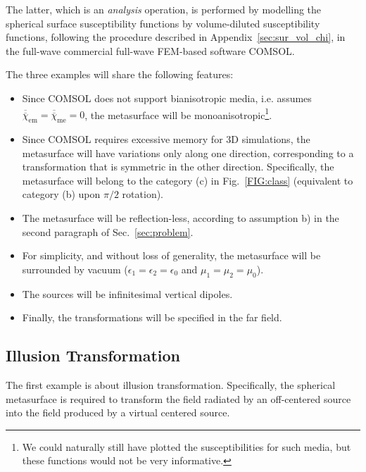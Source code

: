 \documentclass[journal,transaction]{IEEEtran}
\newcommand{\figref}{Fig.~\ref}
\newcommand{\te}[1]{\overline{\overline{#1}}}
\begin{document}
The latter, which is an \emph{analysis} operation, is performed by modelling the spherical surface susceptibility functions by volume-diluted susceptibility functions, following the procedure described in Appendix~\ref{sec:sur_vol_chi}, in the full-wave commercial full-wave FEM-based software COMSOL.

The three examples will share the following features:

\begin{itemize}
  \item Since COMSOL does not support bianisotropic media, i.e. assumes $\te{\chi}_\text{em}=\te{\chi}_\text{me}=0$, the metasurface will be monoanisotropic\footnote{We could naturally still have plotted the susceptibilities for such media, but these functions would not be very informative.}.
  \item Since COMSOL requires excessive memory for 3D simulations, the metasurface will have variations only along one direction, corresponding to a transformation that is symmetric in the other direction. Specifically, the metasurface will belong to the category (c) in \figref{FIG:class} (equivalent to category (b) upon $\pi/2$ rotation).
  \item The metasurface will be reflection-less, according to assumption b) in the second paragraph of Sec.~\ref{sec:problem}.
  \item For simplicity, and without loss of generality, the metasurface will be surrounded by vacuum ($\epsilon_1=\epsilon_2=\epsilon_0$ and $\mu_1=\mu_2=\mu_0$).
  \item The sources will be infinitesimal vertical dipoles.
  \item Finally, the transformations will be specified in the far field.
\end{itemize}


\subsection{Illusion Transformation}

The first example is about illusion transformation. Specifically, the spherical metasurface is required to transform the field radiated by an off-centered source into the field produced by a virtual centered source.
\end{document}

